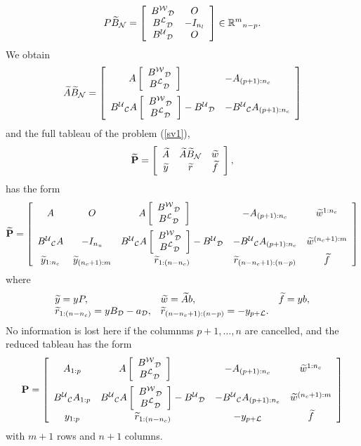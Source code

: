 \[ P\wi{B}_{\N} = \ba{[}{ccc}
B^{\W}{}_{\D} & O\\ B^{\L}{}_{\D} & - I_{n_l}\\ B^{\U}{}_{\D} & O
\ea{]} \in \Bbb{R}^m{}_{n-p}.
\]
We obtain
\[
\wi{A}\wi{B}_{\N} =
\ba{[}{cl} \hspace*{-5mm}\!
 A\ba{[}{c}B^{\W}{}_{\D} \\ B^{\L}{}_{\D}\ea{]} & -A_{(p+1):n_c}\\[4mm]
B^{\U}{}_{\C}A \ba{[}{c}

B^{\W}{}_{\D} \\ B^{\L}{}_{\D}\ea{]}

 - B^{\U}{}_{\D} &
- B^{\U}{}_{\C}A_{(p+1):n_c}
\ea{]}
\]
and the full tableau of the problem (\ref{sv1}),
%
\[
\wi{{\bf P}} = \ba{[}{ccc} \wi{A} & \wi{A}\wi{B}_{\N} & \wi{w} \\
                           \wi{y} & \wi{r}            &  \wi{f}
               \ea{]},
\]
has the form
\[
\wi{{\bf P}} = \ba{[}{ccccc}
 A  & O & \hspace{-5mm} \!A\ba{[}{c}B^{\W}{}_{\D} \\ B^{\L}{}_{\D}\ea{]} &
 - A_{(p+1):n_c} & \wi{w}^{1:n_c}\\[4mm]
%
B^{\U}{}_{\C}A & -I_{n_u} &
B^{\U}{}_{\C}A\ba{[}{c}B^{\W}{}_{\D} \\
B^{\L}{}_{\D} \ea{]} - B^{\U}{}_{\D} &
- B^{\U}{}_{\C}A_{(p+1):n_c}  &
 \wi{w}^{(n_c+1):m}\\
%
\wi{y}_{1:n_c} &
\wi{y}_{(n_c+1):m} &
\wi{r}_{1:(n-n_c)} &
\wi{r}_{(n-n_c+1):(n-p)} &
\wi{f}
\ea{]}
\]
where
\[ \ba{.}{lll}
\wi{y} = yP, & \wi{w} = \wi{A}b, & \wi{f} = yb,\\
\wi{r}_{1:(n-n_c)} = yB_{\D} - a_{\D}, &
\wi{r}_{(n-n_c+1):(n-p)} = - y_{p+\L}.
\ea{.}
\]
No information is lost here if the columnms $p+1, \ldots, n$ are cancelled,
and the reduced tableau has the form
%
\begin{equation} \label{svs7}
{\bf P} = \ba{[}{cccc}
 A_{1:p} & \hspace{-5mm} \! A\ba{[}{c}B^{\W}{}_{\D} \\ B^{\L}{}_{\D} \ea{]} &
- A_{(p+1):n_c}  & \wi{w}^{1:n_c}\\[4mm]
%
B^{\U}{}_{\C}A_{1:p} &
B^{\U}{}_{\C}A\ba{[}{c}B^{\W}{}_{\D} \\
B^{\L}{}_{\D}\ea{]} - B^{\U}{}_{\D} &
 - B^{\U}{}_{\C}A_{(p+1):n_c}
 & \wi{w}^{(n_c+1):m}\\
%
y_{1:p} &  \wi{r}_{1:(n-n_c)} & -y_{p+\L}  & \wi{f}
\ea{]}
\end{equation}
with $m+1$ rows and $n+1$ columns.
